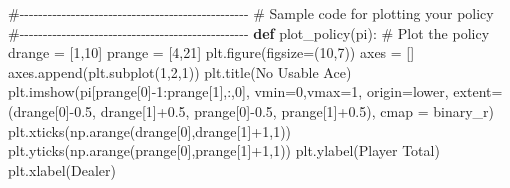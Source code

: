 \documentclass[
  letterpaper,
  DIV=11,
  numbers=noendperiod]{scrartcl}
\newenvironment{Shaded}{\begin{snugshade}}{\end{snugshade}}
\newcommand{\CommentTok}[1]{\textcolor[rgb]{0.37,0.37,0.37}{#1}}
\newcommand{\DecValTok}[1]{\textcolor[rgb]{0.68,0.00,0.00}{#1}}
\newcommand{\FloatTok}[1]{\textcolor[rgb]{0.68,0.00,0.00}{#1}}
\newcommand{\KeywordTok}[1]{\textcolor[rgb]{0.00,0.23,0.31}{\textbf{#1}}}
\newcommand{\NormalTok}[1]{\textcolor[rgb]{0.00,0.23,0.31}{#1}}
\newcommand{\OperatorTok}[1]{\textcolor[rgb]{0.37,0.37,0.37}{#1}}
\newcommand{\StringTok}[1]{\textcolor[rgb]{0.13,0.47,0.30}{#1}}
\begin{document}
\begin{Shaded}
\begin{Highlighting}[]
\CommentTok{\#{-}{-}{-}{-}{-}{-}{-}{-}{-}{-}{-}{-}{-}{-}{-}{-}{-}{-}{-}{-}{-}{-}{-}{-}{-}{-}{-}{-}{-}{-}{-}{-}{-}{-}{-}{-}{-}{-}{-}{-}{-}{-}{-}{-}{-}{-}{-}{-}{-}}
\CommentTok{\# Sample code for plotting your policy}
\CommentTok{\#{-}{-}{-}{-}{-}{-}{-}{-}{-}{-}{-}{-}{-}{-}{-}{-}{-}{-}{-}{-}{-}{-}{-}{-}{-}{-}{-}{-}{-}{-}{-}{-}{-}{-}{-}{-}{-}{-}{-}{-}{-}{-}{-}{-}{-}{-}{-}{-}{-}}
\KeywordTok{def}\NormalTok{ plot\_policy(pi):}
    \CommentTok{\# Plot the policy}
\NormalTok{    drange }\OperatorTok{=}\NormalTok{ [}\DecValTok{1}\NormalTok{,}\DecValTok{10}\NormalTok{]}
\NormalTok{    prange }\OperatorTok{=}\NormalTok{ [}\DecValTok{4}\NormalTok{,}\DecValTok{21}\NormalTok{]}
\NormalTok{    plt.figure(figsize}\OperatorTok{=}\NormalTok{(}\DecValTok{10}\NormalTok{,}\DecValTok{7}\NormalTok{))}
\NormalTok{    axes }\OperatorTok{=}\NormalTok{ []}
\NormalTok{    axes.append(plt.subplot(}\DecValTok{1}\NormalTok{,}\DecValTok{2}\NormalTok{,}\DecValTok{1}\NormalTok{))}
\NormalTok{    plt.title(}\StringTok{\textquotesingle{}No Usable Ace\textquotesingle{}}\NormalTok{)}
\NormalTok{    plt.imshow(pi[prange[}\DecValTok{0}\NormalTok{]}\OperatorTok{{-}}\DecValTok{1}\NormalTok{:prange[}\DecValTok{1}\NormalTok{],:,}\DecValTok{0}\NormalTok{], }
\NormalTok{               vmin}\OperatorTok{=}\DecValTok{0}\NormalTok{,vmax}\OperatorTok{=}\DecValTok{1}\NormalTok{,}
\NormalTok{               origin}\OperatorTok{=}\StringTok{\textquotesingle{}lower\textquotesingle{}}\NormalTok{, }
\NormalTok{               extent}\OperatorTok{=}\NormalTok{(drange[}\DecValTok{0}\NormalTok{]}\OperatorTok{{-}}\FloatTok{0.5}\NormalTok{,}
\NormalTok{                       drange[}\DecValTok{1}\NormalTok{]}\OperatorTok{+}\FloatTok{0.5}\NormalTok{,}
\NormalTok{                       prange[}\DecValTok{0}\NormalTok{]}\OperatorTok{{-}}\FloatTok{0.5}\NormalTok{,}
\NormalTok{                       prange[}\DecValTok{1}\NormalTok{]}\OperatorTok{+}\FloatTok{0.5}\NormalTok{),}
\NormalTok{               cmap }\OperatorTok{=} \StringTok{\textquotesingle{}binary\_r\textquotesingle{}}\NormalTok{)}
\NormalTok{    plt.xticks(np.arange(drange[}\DecValTok{0}\NormalTok{],drange[}\DecValTok{1}\NormalTok{]}\OperatorTok{+}\DecValTok{1}\NormalTok{,}\DecValTok{1}\NormalTok{))}
\NormalTok{    plt.yticks(np.arange(prange[}\DecValTok{0}\NormalTok{],prange[}\DecValTok{1}\NormalTok{]}\OperatorTok{+}\DecValTok{1}\NormalTok{,}\DecValTok{1}\NormalTok{))}
\NormalTok{    plt.ylabel(}\StringTok{\textquotesingle{}Player Total\textquotesingle{}}\NormalTok{)}
\NormalTok{    plt.xlabel(}\StringTok{\textquotesingle{}Dealer\textquotesingle{}}\NormalTok{)}
    

\end{Highlighting}
\end{Shaded}
\end{document}
